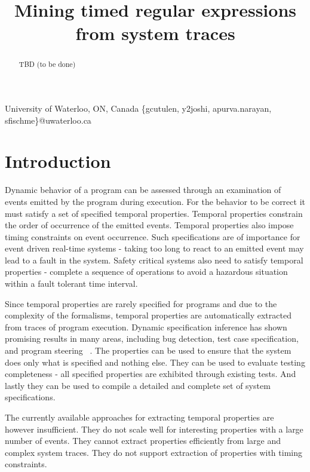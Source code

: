 \documentclass[]{sigplanconf}
\begin{document}
\title{Mining timed regular expressions from system traces}

		   {University of Waterloo, ON, Canada}
		   {\{gcutulen, y2joshi, apurva.narayan, sfischme\}@uwaterloo.ca}

\maketitle


\begin{abstract}

TBD (to be done)

\end{abstract}

\section{Introduction}

Dynamic behavior of a program can be assessed through an examination of events emitted by the program during execution. For the behavior to be correct it must satisfy a set of specified temporal properties. Temporal properties constrain the order of occurrence of the emitted events. Temporal properties also impose timing constraints on event occurrence. Such specifications are of importance for event driven real-time systems - taking too long to react to an emitted event may lead to a fault in the system. Safety critical systems also need to satisfy temporal properties - complete a sequence of operations to avoid a hazardous situation within a fault tolerant time interval.

Since temporal properties are rarely specified for programs and due to the complexity of the formalisms, temporal properties are automatically extracted from traces of program execution. Dynamic specification inference has shown promising results in many areas, including bug detection, test case specification, and program steering ~\cite{evans2}. The properties can be used to ensure that the system does only what is specified and nothing else. They can be used to evaluate testing completeness - all specified properties are exhibited through existing tests. And lastly they can be used to compile a detailed and complete set of system specifications.

The currently available approaches for extracting temporal properties are however insufficient. They do not scale well for interesting properties with a large number of events. They cannot extract properties efficiently from large and complex system traces. They do not support extraction of properties with timing constraints.
\end{document}
